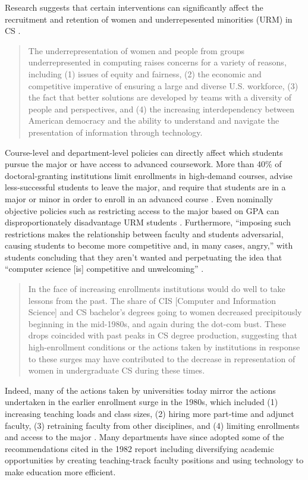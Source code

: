 Research suggests that certain interventions can significantly affect the recruitment and retention of women and underrepesented minorities (URM) in CS \cite{Cohoon:2002, Babes-Vroman:2017, Rheingans:2018, Newhall:2014, Narayanan:2018, Lewis:2017, GenerationCS, RetentionCS, CSUndergraduateEnrollments, DiversityGapsCS}.
\begin{quote}
    The underrepresentation of women and people from groups underrepresented in computing raises concerns for a variety of reasons, including (1) issues of equity and fairness, (2) the economic and competitive imperative of ensuring a large and diverse U.S. workforce, (3) the fact that better solutions are developed by teams with a diversity of people and perspectives, and (4) the increasing interdependency between American democracy and the ability to understand and navigate the presentation of information through technology. \cite{RetentionCS}
\end{quote}
Course-level and department-level policies can directly affect which students pursue the major or have access to advanced coursework. More than 40\% of doctoral-granting institutions limit enrollments in high-demand courses, advise less-successful students to leave the major, and require that students are in a major or minor in order to enroll in an advanced course \cite{GenerationCS}. Even nominally objective policies such as restricting access to the major based on GPA can disproportionately disadvantage URM students \cite{DiversityGapsCS, RetentionCS}. Furthermore, ``imposing such restrictions makes the relationship between faculty and students adversarial, causing students to become more competitive and, in many cases, angry,'' with students concluding that they aren't wanted and perpetuating the idea that ``computer science [is] competitive and unwelcoming'' \cite{Roberts:2016, Patitsas:2014, Patitsas:2016}.

\begin{quote}
    In the face of increasing enrollments institutions would do well to take lessons from the past. The share of CIS [Computer and Information Science] and CS bachelor's degrees going to women decreased precipitously beginning in the mid-1980s, and again during the dot-com bust. These drops coincided with past peaks in CS degree production, suggesting that high-enrollment conditions or the actions taken by institutions in response to these surges may have contributed to the decrease in representation of women in undergraduate CS during these times. \cite{CSUndergraduateEnrollments}
\end{quote}
Indeed, many of the actions taken by universities today mirror the actions undertaken in the earlier enrollment surge in the 1980s, which included (1) increasing teaching loads and class sizes, (2) hiring more part-time and adjunct faculty, (3) retraining faculty from other disciplines, and (4) limiting enrollments and access to the major \cite{Curtis:1982}. Many departments have since adopted some of the recommendations cited in the 1982 report including diversifying academic opportunities by creating teaching-track faculty positions and using technology to make education more efficient.

